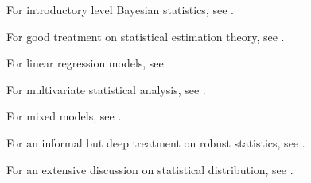 \begin{refsection}
For introductory level Bayesian statistics, see \cite{hoff2009first}.

For good treatment on statistical estimation theory, see \cite{kay1993fundamentals}.


For linear regression models, see \cite{kutner2003applied}\cite{seber2012linear}.

For multivariate statistical analysis, see \cite{johnson2007applied}.

For mixed models, see \cite{mcculloch2001generalized}.

For an informal but deep treatment on robust statistics, see \cite{wilcox2010fundamentals}.

For an extensive discussion on statistical distribution, see \cite{forbes2011statistical}\cite{krishnamoorthy2016handbook}.

\printbibliography
\end{refsection}

